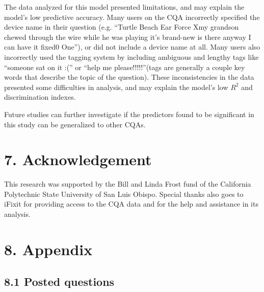 \documentclass{article}
\begin{document}
The data analyzed for this model presented limitations, and may explain the model's low predictive accuracy. Many users on the CQA incorrectly specified the device name in their question (e.g. ``Turtle Beach Ear Force Xmy grandson chewed through the wire while he was playing it's brand-new is there anyway I can have it fixed0 One''), or did not include a device name at all. Many users also incorrectly used the tagging system by including ambiguous and lengthy tags like ``someone sat on it :('' or ``help me please!!!!!''(tags are generally a couple key words that describe the topic of the question). These inconsistencies in the data presented some difficulties in analysis, and may explain the model's low $R^2$ and discrimination indexes. 

Future studies can further investigate if the predictors found to be significant in this study can be generalized to other CQAs. 




\section*{7. Acknowledgement}

This research was supported by the Bill and Linda Frost fund of the California Polytechnic State University of San Luis Obispo. Special thanks also goes to iFixit for providing access to the CQA data and for the help and assistance in its analysis. 



\section*{8. Appendix} 

\subsection*{8.1 Posted questions}
\end{document}
